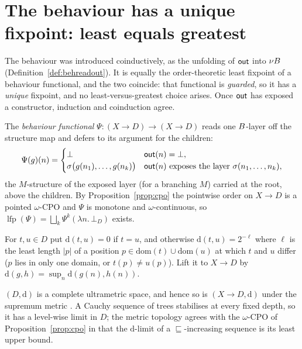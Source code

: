 \section{The behaviour has a unique fixpoint: least equals greatest}\label{sec:unique}
The behaviour was introduced coinductively, as the unfolding of $\mathsf{out}$ into $\nu B$
(Definition~\ref{def:behreadout}). It is equally the order-theoretic least fixpoint of a behaviour
functional, and the two coincide: that functional is \emph{guarded}, so it has a \emph{unique}
fixpoint, and no least-versus-greatest choice arises. Once $\mathsf{out}$ has exposed a constructor,
induction and coinduction agree.

\begin{definition}\label{def:readoutfun}
  The \emph{behaviour functional} $\Psi\colon (X \to D) \to (X \to D)$ reads one $B$-layer off the
  structure map and defers to its argument for the children:
  \[
    \Psi(g)(n) =
    \begin{cases}
      \bot & \mathsf{out}(n) = \bot,\\
      \sigma\big(g(n_1),\dots,g(n_k)\big) & \mathsf{out}(n) \text{ exposes the layer } \sigma(n_1,\dots,n_k),
    \end{cases}
  \]
  the $M$-structure of the exposed layer (for a branching $M$) carried at the root, above the children.
  By Proposition~\ref{prop:cpo} the pointwise order on $X \to D$ is a pointed $\omega$-CPO and $\Psi$ is
  monotone and $\omega$-continuous, so $\operatorname{lfp}(\Psi) = \bigsqcup_{k} \Psi^{k}(\lambda n.\,\bot_D)$
  exists.
\end{definition}

\begin{definition}\label{def:metric}
  For $t,u \in D$ put $\mathrm{d}(t,u) = 0$ if $t = u$, and otherwise $\mathrm{d}(t,u) = 2^{-\ell}$ where
  $\ell$ is the least length $|p|$ of a position $p \in \mathrm{dom}(t) \cup \mathrm{dom}(u)$ at which $t$
  and $u$ differ ($p$ lies in only one domain, or $t(p) \neq u(p)$). Lift it to $X \to D$ by
  $\mathrm{d}(g,h) = \sup_{n} \mathrm{d}(g(n),h(n))$.
\end{definition}

\begin{proposition}\label{prop:metric}
  $(D,\mathrm{d})$ is a complete ultrametric space, and hence so is $(X \to D, \mathrm{d})$ under the
  supremum metric . A Cauchy sequence of trees stabilises at every fixed depth,
  so it has a level-wise limit in $D$; the metric topology agrees with the $\omega$-CPO of
  Proposition~\ref{prop:cpo} in that the $\mathrm{d}$-limit of a $\sqsubseteq$-increasing sequence is its
  least upper bound.
\end{proposition}

